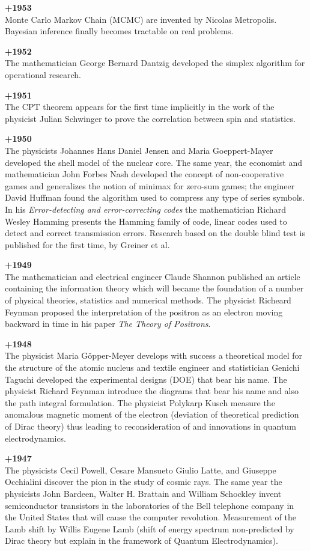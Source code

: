 \textbf{+1953}\\
Monte Carlo Markov Chain (MCMC) are invented by Nicolas Metropolis. Bayesian inference finally becomes tractable on real problems.


\textbf{+1952}\\
The mathematician George Bernard Dantzig developed the simplex algorithm for operational research.

\textbf{+1951}\\
The CPT theorem appears for the first time implicitly in the work of the physicist Julian Schwinger to prove the correlation between spin and statistics.

\textbf{+1950}\\
The physicists Johannes Hans Daniel Jensen and Maria Goeppert-Mayer developed the shell model of the nuclear core. The same year, the economist and mathematician John Forbes Nash developed the concept of non-cooperative games and generalizes the notion of minimax for zero-sum games; the engineer David Huffman found the algorithm used to compress any type of series symbols. In his \textit{Error-detecting and error-correcting codes} the mathematician Richard Wesley Hamming presents the Hamming family of code, linear codes used to detect and correct transmission errors. Research based on the double blind test is published for the first time, by Greiner et al.

\textbf{+1949}\\
The mathematician and electrical engineer Claude Shannon published an article containing the information theory which will became the foundation of a number of physical theories, statistics and numerical methods. The physicist Richeard Feynman proposed the interpretation of the positron as an electron moving backward in time in his paper \textit{The Theory of Positrons}.

\textbf{+1948}\\
The physicist Maria Göpper-Meyer develops with success a theoretical model for the structure of the atomic nucleus and textile engineer and statistician Genichi Taguchi developed the experimental designs (DOE) that bear his name. The physicist Richard Feynman introduce the diagrams that bear his name and also the path integral formulation. The physicist Polykarp Kusch measure the anomalous magnetic moment of the electron (deviation of theoretical prediction of Dirac theory) thus leading to reconsideration of and innovations in quantum electrodynamics. 

\textbf{+1947}\\
The physicists Cecil Powell, Cesare Mansueto Giulio Latte, and Giuseppe Occhialini discover the pion in the study of cosmic rays. The same year the physicists John Bardeen, Walter H. Brattain and William Schockley invent semiconductor transistors in the laboratories of the Bell telephone company in the United States that will cause the computer revolution. Measurement of the Lamb shift by Willis Eugene Lamb (shift of energy spectrum non-predicted by Dirac theory but explain in the framework of Quantum Electrodynamics).

